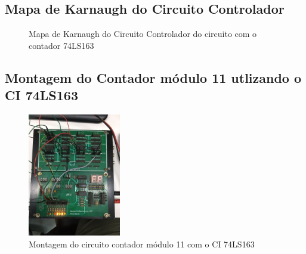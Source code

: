 \documentclass[a4,12pt]{horizon-theme}
\begin{document}
\subsection{Mapa de Karnaugh do Circuito Controlador}
\label{ap:74163_karnaugh}

\begin{figure}[!ht]
\centering
{}
\caption{Mapa de Karnaugh do Circuito Controlador do circuito com o contador 74LS163}
\label{fig:karnaugh_74163}
\end{figure}

\subsection{Montagem do Contador módulo 11 utlizando o CI 74LS163}
\label{ap: 74163_montagem}

\begin{figure}[!ht]
  \centering
  \includegraphics[width=0.36\textwidth, trim={30mm, 110mm, 40mm, 60mm}, clip]{74163_montagem.jpeg}
  \caption{Montagem do circuito contador módulo 11 com o CI 74LS163}
  \label{fig:montagem_74163}
\end{figure}

% 
% 

\horizonBackCover
\end{document}
